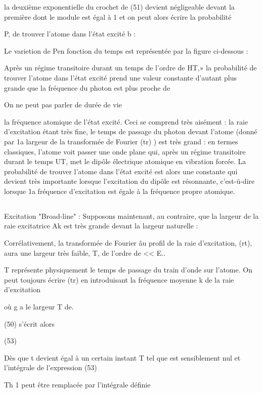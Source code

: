 la deuxième exponentielle du crochet de (51) devient négligeable devant la
première dont le module est égal à 1 et on peut alors écrire la probabilité

P, de trouver l'atome dans l'état excité b :

Le varietion de Pen fonction du temps est représentée par la figure ci-dessous :

Après un régime transitoire durant un temps de l'ordre de
HT,» la probabilité de trouver l'atome dans l'état excité prend une valeur
constante d'autant plus grande que la fréquence du photon est plus proche de

 On ne peut pas parler de durée de vie



la fréquence atomique
de l'état excité.
Ceci se comprend très aisément : la raie d'excitation étant
très fine, le temps de passage du photon devant l'atome (donné par 1a largeur
de la transformée de Fourier  (tr) ) est très grand : en termes classiques,
l'atome voit passer une onde plane qui, après un régime transitoire durant le
temps UT, met le dipôle électrique atomique en vibration forcée. La probabilité de trouver l'atome dans l'état excité est alors une constante qui devient
très importante lorsque l'excitation du dipôle est résonnante, c'est-ü-dire
lorsque 1a fréquence d'excitation est égale à la fréquence propre atomique.
\subsection{} Excitation "Broad-line" :%
Supposons maintenant, au contraire, que la largeur de la raie
excitatrice Ak est très grande devant la largeur naturelle :

Corrélativement, la transformée de Fourier âu profil de la raie
d'excitation, (rt), aura une largeur très faible, T, de l'ordre de  << E..

T représente physiquement le temps de passage du train d'onde sur l'atome.
On peut toujours écrire  (tr) en introduisant la fréquence
moyenne k de la raie d'excitation

où g a le largeur T de.

(50) s'écrit alors

(53)

Dès que t devient égal à un certain instant T tel que
 est sensiblement nul et l'intégrale de l'expression (53)



Th 1
peut être remplacée par l'intégrale définie

